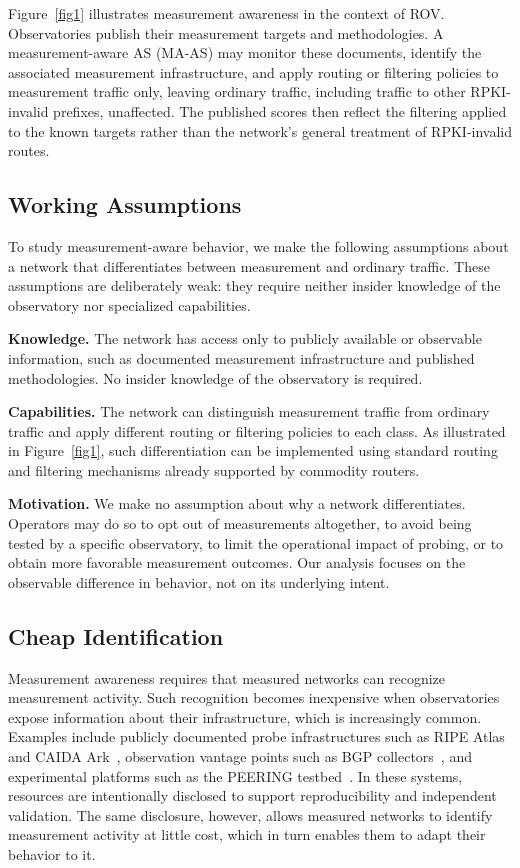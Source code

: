 \documentclass[sigconf, 10pt]{acmart}
\begin{document}
Figure~\ref{fig1} illustrates measurement awareness in the context of ROV. Observatories publish their measurement targets and methodologies. A measurement-aware AS (MA-AS) may monitor these documents, identify the associated measurement infrastructure, and apply routing or filtering policies to measurement traffic only, leaving ordinary traffic, including traffic to other RPKI-invalid prefixes, unaffected. The published scores then reflect the filtering applied to the known targets rather than the network's general treatment of RPKI-invalid routes.

\subsection{Working Assumptions}

To study measurement-aware behavior, we make the following assumptions about a network that differentiates between measurement and ordinary traffic. These assumptions are deliberately weak: they require neither insider knowledge of the observatory nor specialized capabilities.

\textbf{Knowledge.}
The network has access only to publicly available or observable information, such as documented measurement infrastructure and published methodologies. No insider knowledge of the observatory is required.

\textbf{Capabilities.}
The network can distinguish measurement traffic from ordinary traffic and apply different routing or filtering policies to each class. As illustrated in Figure~\ref{fig1}, such differentiation can be implemented using standard routing and filtering mechanisms already supported by commodity routers.

\textbf{Motivation.}
We make no assumption about why a network differentiates. Operators may do so to opt out of measurements altogether, to avoid being tested by a specific observatory, to limit the operational impact of probing, or to obtain more favorable measurement outcomes. Our analysis focuses on the observable difference in behavior, not on its underlying intent.


\subsection{Cheap Identification}

Measurement awareness requires that measured networks can recognize measurement activity. Such recognition becomes inexpensive when observatories expose information about their infrastructure, which is increasingly common. Examples include publicly documented probe infrastructures such as RIPE Atlas and CAIDA Ark~\cite{ripeatlas,caida_ark}, observation vantage points such as BGP collectors~\cite{ripe_ris,routeviews}, and experimental platforms such as the PEERING testbed~\cite{peering}. In these systems, resources are intentionally disclosed to support reproducibility and independent validation. The same disclosure, however, allows measured networks to identify measurement activity at little cost, which in turn enables them to adapt their behavior to it.
\end{document}

